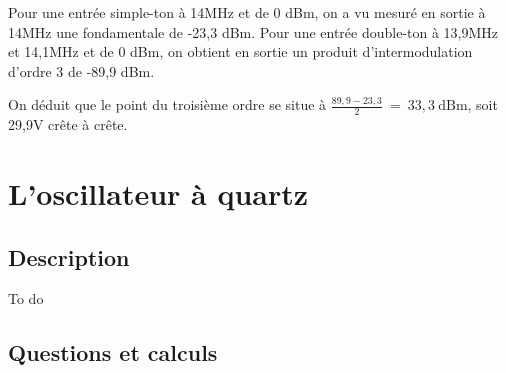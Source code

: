 \documentclass{article}
\begin{document}
Pour une entrée simple-ton à 14MHz et de 0 dBm, on a vu mesuré en sortie à 14MHz une fondamentale de -23,3 dBm. Pour une entrée double-ton à 13,9MHz et 14,1MHz et de 0 dBm, on obtient en sortie un produit d'intermodulation d'ordre 3 de -89,9 dBm.

On déduit que le point du troisième ordre se situe à $\frac{89,9-23,3}{2}~=~33,3~\mathrm{dBm}$, soit 29,9V crête à crête.








\section{L'oscillateur à quartz}

\subsection{Description}
To do

\subsection{Questions et calculs}

\end{document}
